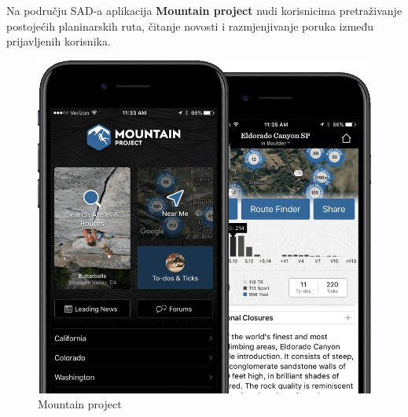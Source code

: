 		Na području SAD-a aplikacija \textbf{Mountain project} nudi korisnicima pretraživanje postojećih planinarskih ruta, čitanje novosti i razmjenjivanje poruka između prijavljenih korisnika.
			
			\begin{figure}[H]
				\includegraphics[scale=0.3]{slike/mountainproject.png} %
				\centering
				\caption{Mountain project}
				\label{fig:slične aplikacije}
			\end{figure}
		
